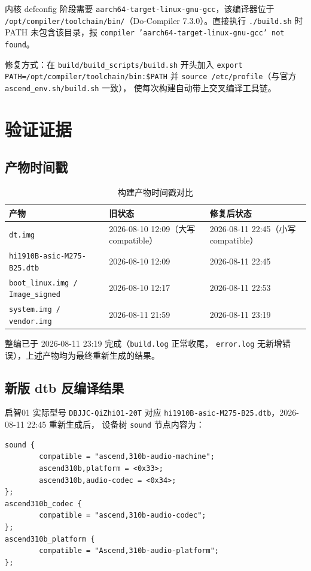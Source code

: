 内核 defconfig 阶段需要 \texttt{aarch64-target-linux-gnu-gcc}，该编译器位于
\texttt{/opt/compiler/toolchain/bin/}（Do-Compiler 7.3.0）。直接执行
\texttt{./build.sh} 时 PATH 未包含该目录，报
\texttt{compiler 'aarch64-target-linux-gnu-gcc' not found}。

修复方式：在 \texttt{build/build\_scripts/build.sh} 开头加入
\texttt{export PATH=/opt/compiler/toolchain/bin:\$PATH} 并
\texttt{source /etc/profile}（与官方 \texttt{ascend\_env.sh/build.sh} 一致），
使每次构建自动带上交叉编译工具链。

\section{验证证据}

\subsection{产物时间戳}

\begin{table}[h]
\centering
\begin{tabular}{|l|l|l|}
\hline
\textbf{产物} & \textbf{旧状态} & \textbf{修复后状态} \\
\hline
\texttt{dt.img} & 2026-08-10 12:09（大写 compatible） & 2026-08-11 22:45（小写 compatible） \\
\hline
\texttt{hi1910B-asic-M275-B25.dtb} & 2026-08-10 12:09 & 2026-08-11 22:45 \\
\hline
\texttt{boot\_linux.img / Image\_signed} & 2026-08-10 12:17 & 2026-08-11 22:53 \\
\hline
\texttt{system.img / vendor.img} & 2026-08-11 21:59 & 2026-08-11 23:19 \\
\hline
\end{tabular}
\caption{构建产物时间戳对比}
\label{tab:timestamp}
\end{table}

整编已于 2026-08-11 23:19 完成（\texttt{build.log} 正常收尾，
\texttt{error.log} 无新增错误），上述产物均为最终重新生成的结果。

\subsection{新版 dtb 反编译结果}

启智01 实际型号 \texttt{DBJJC-QiZhi01-20T} 对应
\texttt{hi1910B-asic-M275-B25.dtb}，2026-08-11 22:45 重新生成后，
设备树 \texttt{sound} 节点内容为：

\begin{lstlisting}[style=shell]
sound {
        compatible = "ascend,310b-audio-machine";
        ascend310b,platform = <0x33>;
        ascend310b,audio-codec = <0x34>;
};
ascend310b_codec {
        compatible = "ascend,310b-audio-codec";
};
ascend310b_platform {
        compatible = "Ascend,310b-audio-platform";
};
\end{lstlisting}

